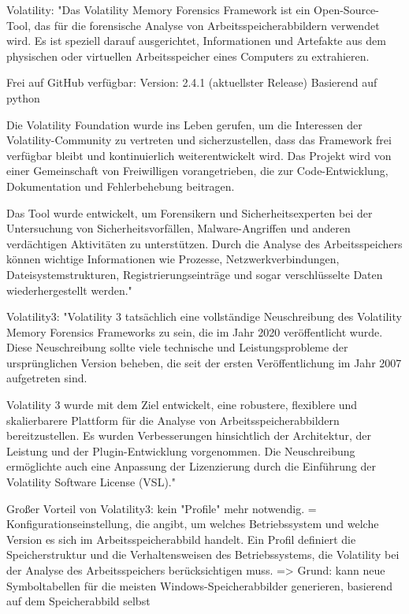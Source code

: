 Volatility: %
	"Das Volatility Memory Forensics Framework ist ein Open-Source-Tool, das für die forensische Analyse von Arbeitsspeicherabbildern verwendet wird. Es ist speziell darauf ausgerichtet, Informationen und Artefakte aus dem physischen oder virtuellen Arbeitsspeicher eines Computers zu extrahieren.
	
	Frei auf GitHub verfügbar: %
	Version: 2.4.1 (aktuellster Release)
	Basierend auf python

	Die Volatility Foundation wurde ins Leben gerufen, um die Interessen der Volatility-Community zu vertreten und sicherzustellen, dass das Framework frei verfügbar 	bleibt und kontinuierlich weiterentwickelt wird. Das Projekt wird von einer Gemeinschaft von Freiwilligen vorangetrieben, die zur Code-Entwicklung, Dokumentation und Fehlerbehebung beitragen.

	Das Tool wurde entwickelt, um Forensikern und Sicherheitsexperten bei der Untersuchung von Sicherheitsvorfällen, Malware-Angriffen und anderen verdächtigen Aktivitäten zu unterstützen. Durch die Analyse des Arbeitsspeichers können wichtige Informationen wie Prozesse, Netzwerkverbindungen, Dateisystemstrukturen, Registrierungseinträge und sogar verschlüsselte Daten wiederhergestellt werden."

	Volatility3:
	"Volatility 3 tatsächlich eine vollständige Neuschreibung des Volatility Memory Forensics Frameworks zu sein, die im Jahr 2020 veröffentlicht wurde. Diese Neuschreibung sollte viele technische und Leistungsprobleme der ursprünglichen Version beheben, die seit der ersten Veröffentlichung im Jahr 2007 aufgetreten sind.

	Volatility 3 wurde mit dem Ziel entwickelt, eine robustere, flexiblere und skalierbarere Plattform für die Analyse von Arbeitsspeicherabbildern bereitzustellen. Es wurden Verbesserungen hinsichtlich der Architektur, der Leistung und der Plugin-Entwicklung vorgenommen. Die Neuschreibung ermöglichte auch eine Anpassung der Lizenzierung durch die Einführung der Volatility Software License (VSL)."

	Großer Vorteil von Volatility3: kein "Profile" mehr notwendig. = Konfigurationseinstellung, die angibt, um welches Betriebssystem und welche Version es sich im Arbeitsspeicherabbild handelt. Ein Profil definiert die Speicherstruktur und die Verhaltensweisen des Betriebssystems, die Volatility bei der Analyse des Arbeitsspeichers berücksichtigen muss.
		=> Grund: kann neue Symboltabellen für die meisten Windows-Speicherabbilder generieren, basierend auf dem Speicherabbild selbst

